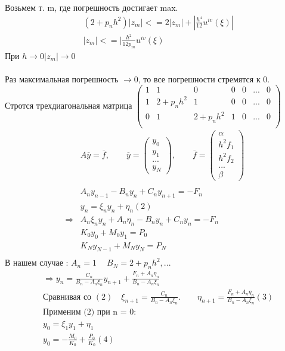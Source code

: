 \documentclass[12pt,a4paper]{article}
\begin{document}
	Возьмем т. m, где погрешность достигает max.
	\begin{align*}
	&(2 + p_n h^2)|z_m| <= 2|z_m| + |\frac{h^4}{12}u^{iv}(\xi)|\\
	&|z_m| <= |\frac{h^2}{12p_m}u^{iv}(\xi) 
	\end{align*}
	При $h \rightarrow 0 	|z_m| \rightarrow 0$\\\\
	Раз максимальная погрешность $\rightarrow 0$, то все погрешности стремятся к 0. \\
	Стротся трехдиагональная матрица
	$\begin{pmatrix}
		1 & 1 & 0 & 0 & 0 & ... & 0  \\
		1 & 2+p_n h^2 & 1 & 0 & 0 & ... & 0	 \\
		0 & 1 & 2+p_n h^2 & 1 & 0 & ... & 0	\\
	\end{pmatrix}$
	\begin{align*}
	&A\overline{y} = \overline{f}, \qquad \overline{y} = 
	\begin{pmatrix}
	y_0\\
	y_1\\
	...\\
	y_N
	\end{pmatrix}, \qquad \overline{f} = 
	\begin{pmatrix}
	\alpha\\
	h^2f_1\\
	h^2f_2\\
	...\\	
	\beta
	\end{pmatrix}\\\\
	&A_n y_{n-1} - B_n y_n + C_n y_{n+1} = -F_n\\
	&y_n = \xi_n y_n + \eta_n (2)\\
	\Rightarrow &A_n \xi_n y_n + A_n \eta_n - B_n y_n + C_n y_n = - F_n\\
	&K_0 y_0 + M_0 y_1 = P_0\\
	&K_N y_{N-1} + M_N y_N = P_N\\
	\end{align*}
	В нашем случае : $A_n = 1\ \quad B_N = 2 + p_n h^2, ...$	
	\begin{align*}
	&\Rightarrow y_n = \frac{C_n}{B_n - A_n \xi_n} y_{n+1} + \frac{F_n + A_n \eta_n}{B_n - A_n \xi_n}\\
	&\text{Сравнивая со } (2) \quad \xi_{n+1} = \frac{C_n}{B_n - A_n \xi_n}. \qquad \eta_{n+1} = \frac{F_n + A_n \eta_n}{B_n - A_n \xi_n} (3) \\ 
	&\text{Применим (2) при n = 0:} \\
	&y_0 = \xi_1 y_1 + \eta_1\\
	&y_0 = -\frac{M_0}{K_0} + \frac{P_0}{K_0} (4)\\
	\end{align*}
\end{document}
